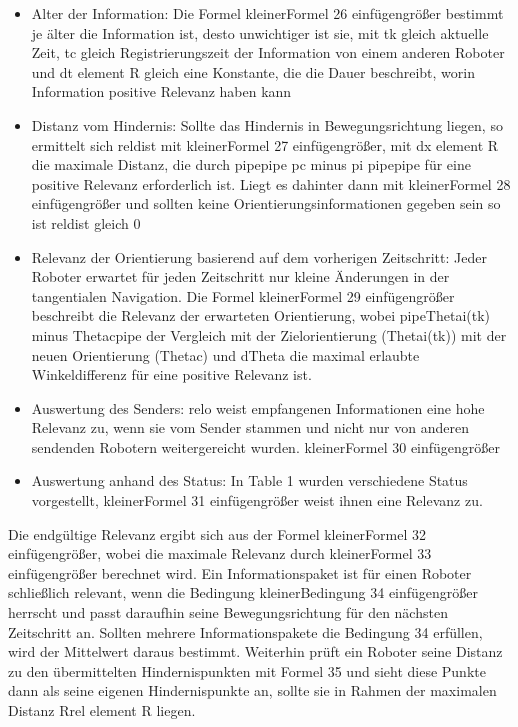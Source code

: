 \documentclass[conference]{IEEEtran}
\begin{document}
\begin{itemize}
    \item Alter der Information: Die Formel kleinerFormel 26 einfügengrößer bestimmt je älter die Information ist, desto unwichtiger ist sie, mit tk gleich aktuelle Zeit, tc gleich Registrierungszeit der Information von einem anderen Roboter und dt element R gleich eine Konstante, die die Dauer beschreibt, worin Information positive Relevanz haben kann
    \item Distanz vom Hindernis: Sollte das Hindernis in Bewegungsrichtung liegen, so ermittelt sich reldist mit kleinerFormel 27 einfügengrößer, mit dx element R die maximale Distanz, die durch pipepipe pc minus pi pipepipe für eine positive Relevanz erforderlich ist. Liegt es dahinter dann mit kleinerFormel 28 einfügengrößer und sollten keine Orientierungsinformationen gegeben sein so ist reldist gleich 0
    \item Relevanz der Orientierung basierend auf dem vorherigen Zeitschritt: Jeder Roboter erwartet für jeden Zeitschritt nur kleine Änderungen in der tangentialen Navigation. Die Formel kleinerFormel 29 einfügengrößer beschreibt die Relevanz der erwarteten Orientierung, wobei pipeThetai(tk) minus Thetacpipe der Vergleich mit der Zielorientierung (Thetai(tk)) mit der neuen Orientierung (Thetac) und dTheta die maximal erlaubte Winkeldifferenz für eine positive Relevanz ist.
    \item Auswertung des Senders: relo weist empfangenen Informationen eine hohe Relevanz zu, wenn sie vom Sender stammen und nicht nur von anderen sendenden Robotern weitergereicht wurden. kleinerFormel 30 einfügengrößer
    \item Auswertung anhand des Status: In Table 1 wurden verschiedene Status vorgestellt, kleinerFormel 31 einfügengrößer weist ihnen eine Relevanz zu.
\end{itemize}
Die endgültige Relevanz ergibt sich aus der Formel kleinerFormel 32 einfügengrößer, wobei die maximale Relevanz durch kleinerFormel 33 einfügengrößer berechnet wird. Ein Informationspaket ist für einen Roboter schließlich relevant, wenn die Bedingung kleinerBedingung 34 einfügengrößer herrscht und passt daraufhin seine Bewegungsrichtung für den nächsten Zeitschritt an. Sollten mehrere Informationspakete die Bedingung 34 erfüllen, wird der Mittelwert daraus bestimmt.
Weiterhin prüft ein Roboter seine Distanz zu den übermittelten Hindernispunkten mit Formel 35 und sieht diese Punkte dann als seine eigenen Hindernispunkte an, sollte sie in Rahmen der maximalen Distanz Rrel element R liegen.
\end{document}
